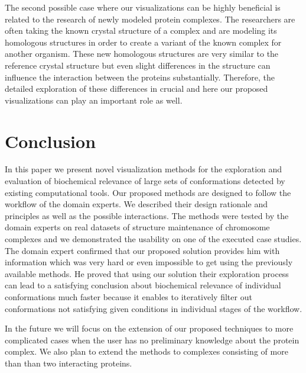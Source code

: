 \documentclass[journal]{vgtc}                %
\begin{document}
The second possible case where our visualizations can be highly beneficial is related to the research of newly modeled protein complexes.
The researchers are often taking the known crystal structure of a complex and are modeling its homologous structures in order to create a variant of the known complex for another organism.
These new homologous structures are very similar to the reference crystal structure but even slight differences in the structure can influence the interaction between the proteins substantially.
Therefore, the detailed exploration of these differences in crucial and here our proposed visualizations can play an important role as well.

\section{Conclusion}
In this paper we present novel visualization methods for the exploration and evaluation of biochemical relevance of large sets of conformations detected by existing computational tools.
Our proposed methods are designed to follow the workflow of the domain experts.
We described their design rationale and principles as well as the possible interactions. 
The methods were tested by the domain experts on real datasets of structure maintenance of chromosome complexes and we demonstrated the usability on one of the executed case studies.
The domain expert confirmed that our proposed solution provides him with information which was very hard or even impossible to get using the previously available methods.
He proved that using our solution their exploration process can lead to a satisfying conclusion about biochemical relevance of individual conformations much faster because it enables to iteratively filter out conformations not satisfying given conditions in individual stages of the workflow.

In the future we will focus on the extension of our proposed techniques to more complicated cases when the user has no preliminary knowledge about the protein complex.
We also plan to extend the methods to complexes consisting of more than than two interacting proteins. 


%

%
%
%

\end{document}
